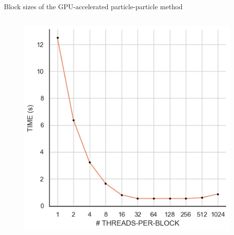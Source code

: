 \documentclass[8pt]{beamer}
\begin{document}
\begin{frame}{Block sizes of the GPU-accelerated particle-particle method}
\begin{columns}
{\begin{figure}
                \includegraphics[width=\textwidth]{img/threadsperblock.png}
            \end{figure}
        }
    \end{columns}


\end{frame}
\end{document}

